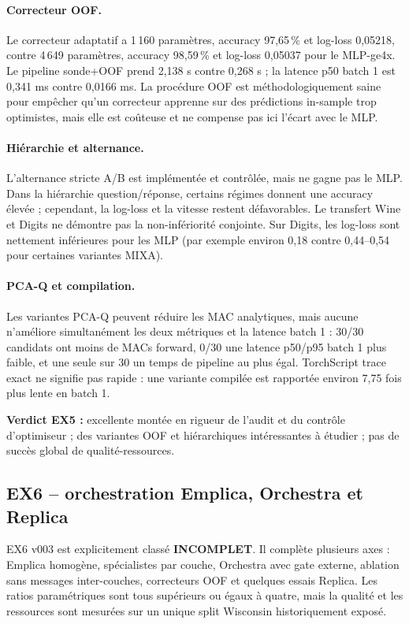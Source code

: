\documentclass[11pt,a4paper]{article}
\begin{document}
\paragraph{Correcteur OOF.} Le correcteur adaptatif a 1\,160 paramètres, accuracy 97,65\,\% et log-loss 0,05218, contre 4\,649 paramètres, accuracy 98,59\,\% et log-loss 0,05037 pour le MLP-ge4x. Le pipeline sonde+OOF prend 2,138 s contre 0,268 s ; la latence p50 batch 1 est 0,341 ms contre 0,0166 ms. La procédure OOF est méthodologiquement saine pour empêcher qu'un correcteur apprenne sur des prédictions in-sample trop optimistes, mais elle est coûteuse et ne compense pas ici l'écart avec le MLP.

\paragraph{Hiérarchie et alternance.} L'alternance stricte A/B est implémentée et contrôlée, mais ne gagne pas le MLP. Dans la hiérarchie question/réponse, certains régimes donnent une accuracy élevée ; cependant, la log-loss et la vitesse restent défavorables. Le transfert Wine et Digits ne démontre pas la non-infériorité conjointe. Sur Digits, les log-loss sont nettement inférieures pour les MLP (par exemple environ 0,18 contre 0,44--0,54 pour certaines variantes MIXA).

\paragraph{PCA-Q et compilation.} Les variantes PCA-Q peuvent réduire les MAC analytiques, mais aucune n'améliore simultanément les deux métriques et la latence batch 1 : 30/30 candidats ont moins de MACs forward, 0/30 une latence p50/p95 batch 1 plus faible, et une seule sur 30 un temps de pipeline au plus égal. TorchScript trace exact ne signifie pas rapide : une variante compilée est rapportée environ 7,75 fois plus lente en batch 1.

\textbf{Verdict EX5 :} excellente montée en rigueur de l'audit et du contrôle d'optimiseur ; des variantes OOF et hiérarchiques intéressantes à étudier ; pas de succès global de qualité-ressources.

\subsection{EX6 -- orchestration Emplica, Orchestra et Replica}

EX6 v003 est explicitement classé \textbf{INCOMPLET}. Il complète plusieurs axes : Emplica homogène, spécialistes par couche, Orchestra avec gate externe, ablation sans messages inter-couches, correcteurs OOF et quelques essais Replica. Les ratios paramétriques sont tous supérieurs ou égaux à quatre, mais la qualité et les ressources sont mesurées sur un unique split Wisconsin historiquement exposé.
\end{document}
